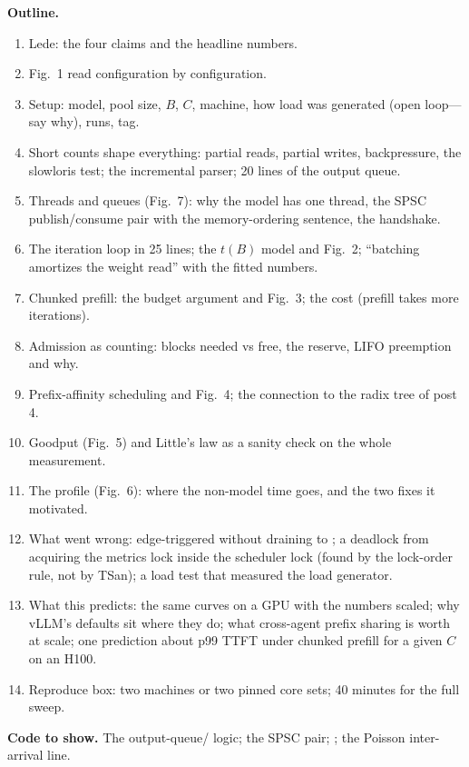 \begin{blogbox}
\textbf{Outline.}
\begin{enumerate}
  \item Lede: the four claims and the headline numbers.
  \item Fig.~1 read configuration by configuration.
  \item Setup: model, pool size, $B$, $C$, machine, how load was generated (open loop---say why), runs, tag.
  \item Short counts shape everything: partial reads, partial writes, backpressure, the slowloris test; the incremental parser; 20 lines of the output queue.
  \item Threads and queues (Fig.~7): why the model has one thread, the SPSC publish/consume pair with the memory-ordering sentence, the  handshake.
  \item The iteration loop in 25 lines; the $t(B)$ model and Fig.~2; ``batching amortizes the weight read'' with the fitted numbers.
  \item Chunked prefill: the budget argument and Fig.~3; the cost (prefill takes more iterations).
  \item Admission as counting: blocks needed vs free, the reserve, LIFO preemption and why.
  \item Prefix-affinity scheduling and Fig.~4; the connection to the radix tree of post 4.
  \item Goodput (Fig.~5) and Little's law as a sanity check on the whole measurement.
  \item The profile (Fig.~6): where the non-model time goes, and the two fixes it motivated.
  \item What went wrong: edge-triggered  without draining to ; a deadlock from acquiring the metrics lock inside the scheduler lock (found by the lock-order rule, not by TSan); a load test that measured the load generator.
  \item What this predicts: the same curves on a GPU with the numbers scaled; why vLLM's defaults sit where they do; what cross-agent prefix sharing is worth at scale; one prediction about p99 TTFT under chunked prefill for a given $C$ on an H100.
  \item Reproduce box: two machines or two pinned core sets; 40 minutes for the full sweep.
\end{enumerate}

\textbf{Code to show.} The output-queue/ logic; the SPSC pair; ; the Poisson inter-arrival line.


\end{blogbox}
